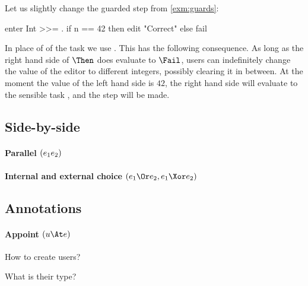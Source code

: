 \begin{example}

Let us slightly change the guarded step from \autoref{exm:guards}:
\begin{TASK}
  enter Int >>= \n. if n == 42 then edit "Correct" else fail
\end{TASK}
In place of of the task  we use .
This has the following consequence.
As long as the right hand side of $\Then$ does evaluate to $\Fail$,
users can indefinitely change the value of the editor to different integers,
possibly clearing it in between.
At the moment the value of the left hand side is $42$,
the right hand side will evaluate to the sensible task ,
and the step will be made.

\end{example}



\subsection{Side-by-side}



\paragraph{Parallel $(e_1 \relax e_2)$}




\paragraph{Internal and external choice $(e_1 \Or e_2, e_1 \Xor e_2)$}




\subsection{Annotations}

\paragraph{Appoint $(u \At e)$}

\begin{itemize*}
  \item How to create users?
  \item What is their type?
\end{itemize*}
